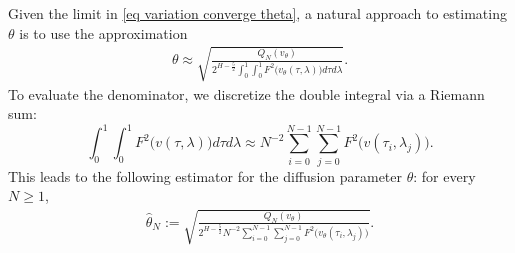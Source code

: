 \documentclass[11pt,reqno]{amsart}
\numberwithin{equation}{section}
\newcommand{\1}{{\bf 1}}
\newcommand{\2}{{\bf 2}}
\begin{document}
Given the limit in \eqref{eq variation converge theta},  a natural approach  to estimating  $\theta$ is to use  the  approximation 
    \begin{align}\label{eq appr1}
   \theta  \approx \sqrt{\frac{Q_{N}(v_{\theta}) }{2^{H-\frac{5}{2}} \int_0^1\int_0^1 F^2\big(v_{\theta}(\tau, \lambda) \big) d\tau d\lambda}}.
    \end{align}
    To evaluate the  denominator,   we discretize the  double integral via  a   Riemann  sum:
    $$
    \int_0^1\int_0^1 F^2\big(v(\tau, \lambda) \big) d\tau d\lambda\approx N^{-2} \sum_{i=0}^{N-1} \sum_{j=0}^{N-1} F^2\big(v(\tau_i, \lambda_j) \big).
    $$
    This leads to the following estimator for    the diffusion parameter $\theta$:  for every $N\ge1$,  
      \begin{align}\label{eq appr2}
    \hat \theta_N := \sqrt{\frac{Q_{N}(v_{\theta})}{ 2^{H-\frac{5}{2}} N^{-2} \sum_{i=0}^{N-1} \sum_{j=0}^{N-1} F^2\big(v_{\theta}(\tau_i, \lambda_j) \big)}}.
    \end{align}
    
\end{document}
